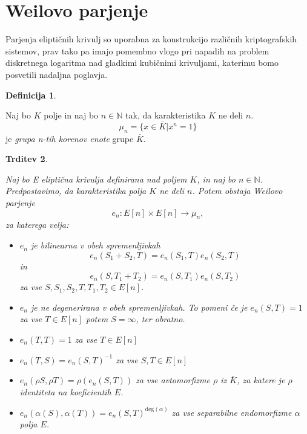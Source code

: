 \documentclass[12pt,a4paper,twoside]{article}
\theoremstyle{definition} %
\newtheorem{definicija}{Definicija}[section]
\theoremstyle{plain} %
\newtheorem{trditev}[definicija]{Trditev}
\numberwithin{equation}{section}  %
\newcommand{\N}{\mathbb N}
\begin{document}
\newpage
\section{Weilovo parjenje}
Parjenja eliptičnih krivulj so uporabna za konstrukcijo različnih kriptografskih sistemov, prav tako pa imajo pomembno vlogo pri napadih na problem diskretnega logaritma nad
gladkimi kubičnimi krivuljami, katerimu bomo posvetili nadaljna poglavja.

\begin{definicija}~

Naj bo $K$ polje in naj bo $n \in \N$ tak, da karakteristika $K$ ne deli $n$.
$$\mu_n = \{ x \in \overline{K} | x^n = 1 \}$$
je \emph{grupa n-tih korenov enote} grupe $\overline{K}$.
\end{definicija}

\begin{trditev}~

\label{trd-WeilPar}
Naj bo E eliptična krivulja definirana nad poljem $K$, in naj bo $n \in \N$. Predpostavimo, da karakteristika polja $K$ ne deli $n$. Potem obstaja Weilovo parjenje
$$e_n:E[n] \times E[n] \rightarrow \mu_n,$$
za katerega velja:
\begin{itemize}
\item $e_n$ je bilinearna v obeh spremenljivkah
$$e_n(S_1+S_2,T) = e_n(S_1,T)e_n(S_2,T)$$
in
$$e_n(S,T_1+T_2) = e_n(S,T_1)e_n(S,T_2)$$
za vse $S,S_1,S_2,T,T_1,T_2 \in E[n]$.
\item $e_n$ je ne degenerirana v obeh spremenljivkah. To pomeni če je $e_n(S,T) = 1$ za vse $T \in E[n]$ potem $S = \infty$, ter obratno.

\item $e_n(T,T) = 1$ za vse $T \in E[n]$

\item $e_n(T,S) = e_n(S,T)^{-1}$ za vse $S,T \in E[n]$

\item $e_n(\rho S,\rho T) = \rho(e_n(S,T))$ za vse avtomorfizme $\rho$ iz $\bar{K}$, za katere je $\rho$ identiteta na koeficientih $E$.

\item $e_n(\alpha(S),\alpha(T)) = e_n(S,T)^{\text{deg}(\alpha)}$ za vse separabilne endomorfizme $\alpha$ polja $E$.
\end{itemize}

\end{trditev}
\end{document}
